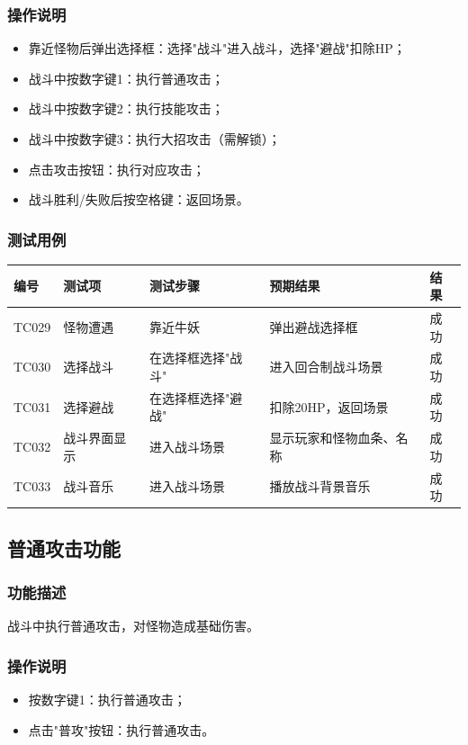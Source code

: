 \documentclass[a4paper,12pt]{article}
\begin{document}
\subsubsection{操作说明}
\begin{itemize}[leftmargin=2em]
    \item 靠近怪物后弹出选择框：选择"战斗"进入战斗，选择"避战"扣除HP；
    \item 战斗中按数字键1：执行普通攻击；
    \item 战斗中按数字键2：执行技能攻击；
    \item 战斗中按数字键3：执行大招攻击（需解锁）；
    \item 点击攻击按钮：执行对应攻击；
    \item 战斗胜利/失败后按空格键：返回场景。
\end{itemize}

\subsubsection{测试用例}
\begin{longtable}{p{1.2cm} p{2.8cm} p{4cm} p{3.5cm} p{1.5cm}}
\toprule
\textbf{编号} & \textbf{测试项} & \textbf{测试步骤} & \textbf{预期结果} & \textbf{结果} \\
\midrule
\endhead
TC029 & 怪物遭遇 & 靠近牛妖 & 弹出避战选择框 & 成功 \\
TC030 & 选择战斗 & 在选择框选择"战斗" & 进入回合制战斗场景 & 成功 \\
TC031 & 选择避战 & 在选择框选择"避战" & 扣除20HP，返回场景 & 成功 \\
TC032 & 战斗界面显示 & 进入战斗场景 & 显示玩家和怪物血条、名称 & 成功 \\
TC033 & 战斗音乐 & 进入战斗场景 & 播放战斗背景音乐 & 成功 \\
\bottomrule
\end{longtable}

\subsection{普通攻击功能}

\subsubsection{功能描述}
战斗中执行普通攻击，对怪物造成基础伤害。

\subsubsection{操作说明}
\begin{itemize}[leftmargin=2em]
    \item 按数字键1：执行普通攻击；
    \item 点击"普攻"按钮：执行普通攻击。
\end{itemize}
\end{document}
